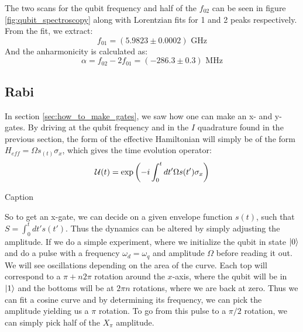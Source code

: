The two scans for the qubit frequency and half of the $f_{02}$ can be seen in figure \ref{fig:qubit_spectroscopy} along with Lorentzian fits for 1 and 2 peaks respectively. From the fit, we extract:
\begin{equation}
    f_{01} = (5.9823 \pm 0.0002) \text{ GHz}
\end{equation}
And the anharmonicity is calculated as:
\begin{equation}
    \alpha = f_{02} - 2f_{01} = (-286.3 \pm 0.3) \text{ MHz}
\end{equation}





\subsection{Rabi}
In section \ref{sec:how_to_make_gates}, we saw how one can make an x- and y-gates. By driving at the qubit frequency and in the $I$ quadrature found in the previous section, the form of the effective Hamiltonian will simply be of the form $H_{eff} = \Omega s_(t) \sigma_x$, which gives the time evolution operator:
\begin{equation}
    \mathcal{U}(t) = \exp\left(-i\int_0^t dt' \Omega s(t') \sigma_x \right)
\end{equation}
\begin{marginfigure}
    \centering
    \caption{Caption}
    \label{fig:enter-label}
\end{marginfigure}
So to get an x-gate, we can decide on a given envelope function $s(t)$, such that $S = \int_0^t  dt' s(t')$. Thus the dynamics can be altered by simply adjusting the amplitude. If we do a simple experiment, where we initialize the qubit in state $\ket{0}$ and do a pulse with a frequency $\omega_d = \omega_q$ and amplitude $\Omega$ before reading it out. We will see oscillations depending on the area of the curve. Each top will correspond to a $\pi +n2\pi$ rotation around the $x$-axis, where the qubit will be in $\ket{1}$ and the bottoms will be at $2\pi n$ rotations, where we are back at zero. Thus we can fit a cosine curve and by determining its frequency, we can pick the amplitude yielding us a $\pi$ rotation. To go from this pulse to a $\pi/2$ rotation, we can simply pick half of the $X_{\pi}$ amplitude.

